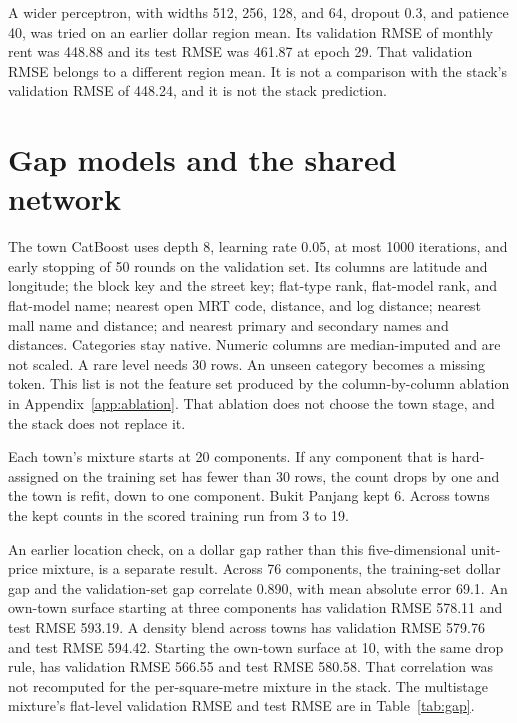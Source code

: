 \documentclass[11pt,a4paper]{article}
\begin{document}
A wider perceptron, with widths 512, 256, 128, and 64, dropout 0.3, and patience 40, was tried on an earlier dollar region mean.
Its validation RMSE of monthly rent was 448.88 and its test RMSE was 461.87 at epoch 29.
That validation RMSE belongs to a different region mean.
It is not a comparison with the stack's validation RMSE of 448.24, and it is not the stack prediction.

\section{Gap models and the shared network}
\label{app:gap}

The town CatBoost uses depth 8, learning rate 0.05, at most 1000 iterations, and early stopping of 50 rounds on the validation set.
Its columns are latitude and longitude; the block key and the street key; flat-type rank, flat-model rank, and flat-model name; nearest open MRT code, distance, and log distance; nearest mall name and distance; and nearest primary and secondary names and distances.
Categories stay native.
Numeric columns are median-imputed and are not scaled.
A rare level needs 30 rows.
An unseen category becomes a missing token.
This list is not the feature set produced by the column-by-column ablation in Appendix~\ref{app:ablation}.
That ablation does not choose the town stage, and the stack does not replace it.

Each town's mixture starts at 20 components.
If any component that is hard-assigned on the training set has fewer than 30 rows, the count drops by one and the town is refit, down to one component.
Bukit Panjang kept 6.
Across towns the kept counts in the scored training run from 3 to 19.

An earlier location check, on a dollar gap rather than this five-dimensional unit-price mixture, is a separate result.
Across 76 components, the training-set dollar gap and the validation-set gap correlate 0.890, with mean absolute error 69.1.
An own-town surface starting at three components has validation RMSE 578.11 and test RMSE 593.19.
A density blend across towns has validation RMSE 579.76 and test RMSE 594.42.
Starting the own-town surface at 10, with the same drop rule, has validation RMSE 566.55 and test RMSE 580.58.
That correlation was not recomputed for the per-square-metre mixture in the stack.
The multistage mixture's flat-level validation RMSE and test RMSE are in Table~\ref{tab:gap}.
\end{document}
